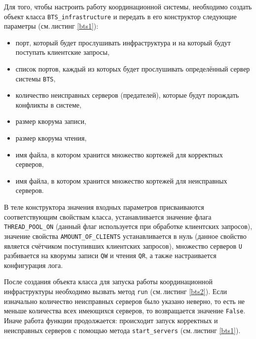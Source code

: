 Для того, чтобы настроить работу координационной системы, необходимо создать объект класса \texttt{BTS_infrastructure} и передать в его конструктор следующие параметры (см.\,листинг \ref{bts1}):
\begin{itemize}
	\item порт, который будет прослушивать инфраструктура и на который будут поступать клиентские запросы,
	\item список портов, каждый из которых будет прослушивать определённый сервер системы \texttt{BTS},
	\item количество неисправных серверов (предателей), которые будут порождать конфликты в системе,
	\item размер кворума записи,
	\item размер кворума чтения,
	\item имя файла, в котором хранится множество кортежей для корректных серверов,
	\item имя файла, в котором хранится множество кортежей для неисправных серверов.
\end{itemize}
В теле конструктора значения входных параметров присваиваются соответствующим свойствам класса, устанавливается значение флага \texttt{THREAD_POOL_ON} (данный флаг используется при обработке клиентских запросов), значение свойства \texttt{AMOUNT_OF_CLIENTS} устанавливается в нуль (данное свойство является счётчиком поступивших клиентских запросов), множество серверов \texttt{U} разбивается на кворумы записи \texttt{QW} и чтения \texttt{QR}, а также настраивается конфигурация лога. 

После создания объекта класса для запуска работы координационной инфраструктуры необходимо вызвать метод \texttt{run} (см.\,листинг \ref{bts2}). Если изначально количество неисправных серверов было указано неверно, то есть не меньше количества всех имеющихся серверов, то возвращается значение \texttt{False}. Иначе работа функции продолжается: происходит запуск корректных и неисправных серверов с помощью метода \texttt{start_servers} (см.\,листинг \ref{bts1}).

